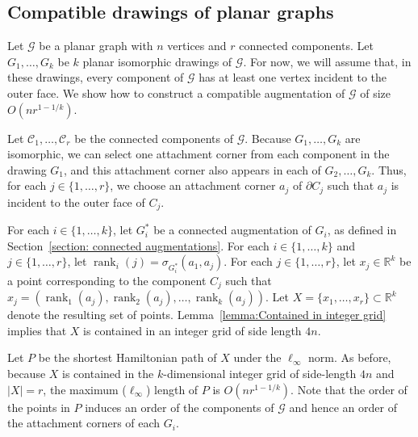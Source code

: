 \documentclass[11pt]{patmorin}
\DeclareMathOperator{\rank}{rank}
\newcommand{\R}{\mathbb{R}}
\begin{document}
\subsection{Compatible drawings of planar graphs}
Let $\mathcal G$ be a planar graph with $n$ vertices and $r$ connected
components.  Let $G_1, \ldots, G_k$ be $k$ planar isomorphic drawings
of $\mathcal G$.  For now, we will assume that, in these drawings,
every component of $\mathcal G$ has at least one vertex incident to
the outer face.  
We show how to construct a compatible augmentation of $\mathcal G$
of size $O(nr^{1-1/k})$.

Let $\mathcal C_1, \ldots, \mathcal C_r$ be the connected components of $\mathcal G$.  Because $G_1,\ldots,G_k$ are isomorphic, we can select one attachment corner from each component in the drawing $G_1$, and this attachment corner also appears in each of $G_2,\ldots,G_k$. Thus, for each $j\in\{1,\ldots,r\}$, we choose an attachment corner $a_j$ of $\partial C_j$ such that $a_j$ is incident to the outer face of $C_j$.

For each $i\in \{1,\dots,k\}$, let $G_i^*$ be a connected augmentation of $G_i$, as defined in Section~\ref{section: connected augmentations}. For each $i\in\{1,\ldots,k\}$ and $j\in\{1,\ldots,r\}$, let $\rank_i(j) = \sigma_{G_i^*}(a_1, a_j)$. For each $j\in\{1,\ldots,r\}$, let $x_j\in \mathbb{R}^k$ be a point corresponding to the component $C_j$ such that $x_j = (\rank_1(a_j), \rank_2(a_j), \ldots, \rank_k(a_j))$. Let $X = \{x_1, \ldots, x_r\}\subset\R^k$ denote the resulting set of points. Lemma~\ref{lemma:Contained in integer grid} implies that $X$ is contained in an integer grid of side length $4n$.

Let $P$ be the shortest Hamiltonian path of $X$ under the $\ell_\infty$ norm. As before, because $X$ is contained in the $k$-dimensional integer grid of side-length $4n$ and $|X| = r$, the maximum ($\ell_\infty$) length of $P$ is $O(nr^{1-1/k})$. Note that the order of the points in $P$ induces an order of the components of $\mathcal G$ and hence an order of the attachment corners of each $G_i$.
\end{document}
